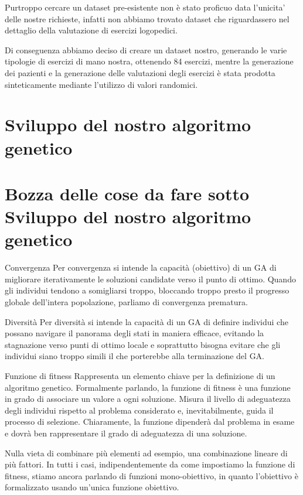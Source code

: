 \documentclass{article}
\begin{document}
    Purtroppo cercare un dataset pre-esistente non è stato proficuo data l'unicita' delle nostre richieste, infatti non abbiamo trovato dataset che
    riguardassero nel dettaglio della valutazione di esercizi logopedici.


    Di conseguenza abbiamo deciso di creare un dataset nostro, generando le varie tipologie di esercizi di mano nostra, ottenendo 84 esercizi, mentre la generazione
    dei pazienti e la generazione delle valutazioni degli esercizi è stata prodotta sinteticamente mediante l'utilizzo di valori randomici.



    \section{Sviluppo del nostro algoritmo genetico}
    \section{Bozza delle cose da fare sotto Sviluppo del nostro algoritmo genetico}

    Convergenza Per convergenza si intende la capacità (obiettivo) di un GA di migliorare iterativamente le soluzioni candidate verso il punto di ottimo. Quando gli
    individui tendono a somigliarsi troppo, bloccando troppo presto il progresso globale dell’intera popolazione, parliamo di convergenza prematura.


    Diversità Per diversità si intende la capacità di un GA di definire individui che possano navigare il panorama degli stati in maniera efficace, evitando la
    stagnazione verso punti di ottimo locale e soprattutto bisogna evitare che gli individui siano troppo simili il che porterebbe alla terminazione del GA.


    Funzione di fitness Rappresenta un elemento chiave per la definizione di un algoritmo genetico. Formalmente parlando, la funzione di fitness è una funzione in grado
    di associare un valore a ogni soluzione. Misura il livello di adeguatezza degli individui rispetto al problema considerato e, inevitabilmente, guida il
    processo di selezione. Chiaramente, la funzione dipenderà dal problema in esame e dovrà ben rappresentare il grado di adeguatezza di una soluzione.


    Nulla vieta di combinare più elementi ad esempio, una combinazione lineare di più fattori. In tutti i casi, indipendentemente da come impostiamo la funzione di
    fitness, stiamo ancora parlando di funzioni mono-obiettivo, in quanto l’obiettivo è formalizzato usando un’unica funzione obiettivo.
\end{document}
